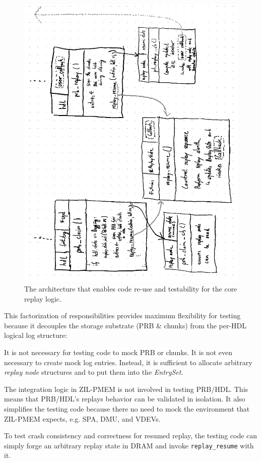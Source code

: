 \documentclass[12pt,a4paper,twoside]{book}
\begin{document}
\begin{figure}[H]
    \centering
    \includegraphics{fig/prb_replay_resume_architecture}
    \caption{The architecture that enables code re-use and testability for the core replay logic.}
    \label{fig:eval:prb_replay_resume_architecture}
\end{figure}

This factorization of responsibilities provides maximum flexibility for testing because it decouples the storage substrate (PRB \& chunks) from the per-HDL logical log structure:
\begin{description}[noitemsep,leftmargin=1.5cm,labelindent=1cm]
    \item[Independence of PRB \& Chunks]
        It is not necessary for testing code to mock PRB or chunks.
        It is not even necessary to create mock log entries.
        Instead, it is sufficient to allocate arbitrary \textit{replay node} structures and to put them into the \textit{EntrySet}.

    \item[Independence of ZIL-PMEM]
        The integration logic in ZIL-PMEM is not involved in testing PRB/HDL.
        This means that PRB/HDL's replays behavior can be validated in isolation.
        It also simplifies the testing code because there no need to mock the environment that ZIL-PMEM expects, e.g. SPA, DMU, and VDEVs.

    \item[Crash Consistency Testing]
        To test crash consistency and correctness for resumed replay, the testing code can simply forge an arbitrary replay state in DRAM and invoke \lstinline{replay_resume} with it.
\end{description}
\end{document}
